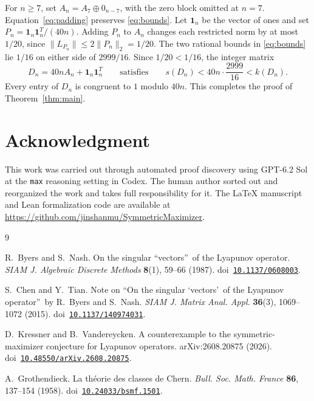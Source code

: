\documentclass[11pt,letterpaper]{article}
\newcommand{\doi}[1]{\mbox{doi \href{https://doi.org/#1}{\nolinkurl{#1}}}}
\begin{document}
For \(n\ge7\), set \(A_n=A_7\oplus0_{n-7}\), with the zero block
omitted at \(n=7\). Equation~\eqref{eq:padding} preserves
\eqref{eq:bounds}. Let \(\mathbf 1_n\) be the vector of ones and
set \(P_n=\mathbf 1_n\mathbf 1_n^T/(40n)\). Adding \(P_n\) to
\(A_n\) changes each restricted norm by at most \(1/20\), since
\(\|L_{P_n}\|\le2\|P_n\|_2=1/20\).
The two rational bounds in \eqref{eq:bounds} lie \(1/16\) on
either side of \(2999/16\). Since \(1/20<1/16\), the integer matrix
\[
D_n=40nA_n+\mathbf 1_n\mathbf 1_n^T
\qquad\text{satisfies}\qquad
s(D_n)<40n\cdot\frac{2999}{16}<k(D_n).
\]
Every entry of \(D_n\) is congruent to \(1\) modulo \(40n\).
This completes the proof of Theorem~\ref{thm:main}.

\section*{Acknowledgment}
This work was carried out through automated proof discovery using
GPT-6.2 Sol at the \texttt{max} reasoning setting in Codex. The human author
sorted out and reorganized the work and takes full responsibility for it.
The \LaTeX{} manuscript and Lean formalization code are available at
\url{https://github.com/jinshanmu/SymmetricMaximizer}.

\begin{thebibliography}{9}

R.~Byers and S.~Nash.
On the singular \textquotedblleft vectors\textquotedblright\ of the
Lyapunov operator.
\emph{SIAM J. Algebraic Discrete Methods} \textbf{8}(1), 59--66 (1987).
\doi{10.1137/0608003}.

S.~Chen and Y.~Tian.
Note on \textquotedblleft On the singular \textquoteleft vectors\textquoteright\
of the Lyapunov operator\textquotedblright\ by R.~Byers and S.~Nash.
\emph{SIAM J. Matrix Anal. Appl.} \textbf{36}(3), 1069--1072 (2015).
\doi{10.1137/140974031}.

D.~Kressner and B.~Vandereycken.
A counterexample to the symmetric-maximizer conjecture for Lyapunov operators.
arXiv:2608.20875 (2026).
\doi{10.48550/arXiv.2608.20875}.

A.~Grothendieck.
La th\'eorie des classes de Chern.
\emph{Bull. Soc. Math. France} \textbf{86}, 137--154 (1958).
\doi{10.24033/bsmf.1501}.

\end{thebibliography}
\end{document}
